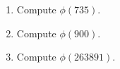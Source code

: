   \mbox{}
  \begin{enumerate}[nosep,label=\textnormal{(\alph*)}]
  \item  Compute $\phi(735)$.
  \item  Compute $\phi(900)$.
  \item  Compute $\phi(263891)$.
  \end{enumerate}
